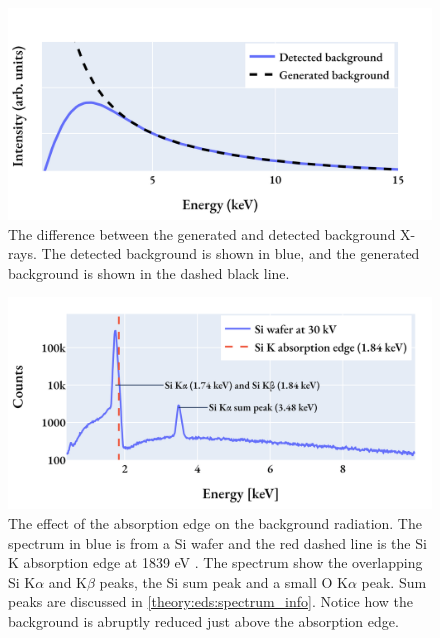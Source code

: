 \begin{figure}[pht]
    \centering
    \includegraphics[width=0.8\linewidth]{figures/background_generated_detected.png}
    \caption{
        The difference between the generated and detected background X-rays.
        The detected background is shown in blue, and the generated background is shown in the dashed black line.
    }
    \label{fig:background_xrays}
\end{figure}

\begin{figure}[pht]
    \centering
    \includegraphics[width=0.8\linewidth]{figures/background_absorptionEdge_Si.png}
    \caption{
        The effect of the absorption edge on the background radiation.
        The spectrum in blue is from a Si wafer and the red dashed line is the Si K absorption edge at 1839 eV \cite{absorptionEdges_1967,hyperspy_1.7.1}.
        The spectrum show the overlapping Si K$\alpha$ and K$\beta$ peaks, the Si sum peak and a small O K$\alpha$ peak.
        Sum peaks are discussed in \cref{theory:eds:spectrum_info}.
        Notice how the background is abruptly reduced just above the absorption edge.
    }
    \label{fig:background_absorptionEdgeSi}
\end{figure}




